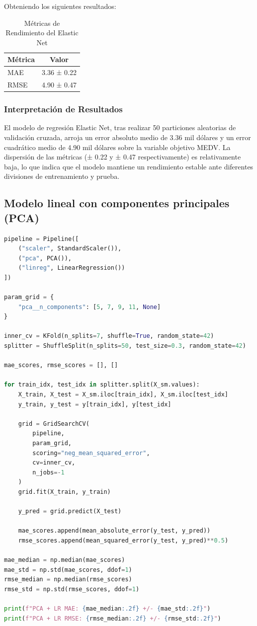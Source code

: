 \documentclass[12pt,a4paper]{article}
\begin{document}
Obteniendo los siguientes resultados:

\begin{table}[H]
\centering
\caption{Métricas de Rendimiento del Elastic Net}\label{tab:elastic_net_resultados}
\begin{tabular}{lc}
\toprule
\textbf{Métrica} & \textbf{Valor} \\
\midrule
MAE & 3.36 ± 0.22 \\
RMSE & 4.90 ± 0.47 \\
\bottomrule
\end{tabular}
\end{table}

\subsubsection{Interpretación de Resultados}
El modelo de regresión Elastic Net, tras realizar 50 particiones aleatorias de validación cruzada, arroja un error absoluto medio de 3.36 mil dólares y un error cuadrático medio de 4.90 mil dólares sobre la variable objetivo MEDV.
La dispersión de las métricas (± 0.22 y ± 0.47 respectivamente) es relativamente baja, lo que indica que el modelo mantiene un rendimiento estable ante diferentes divisiones de entrenamiento y prueba.
\vspace{1cm}

\subsection{Modelo lineal con componentes principales (PCA)}

\begin{lstlisting}[language=Python, frame=single, basicstyle=\ttfamily\small, breaklines=true]
pipeline = Pipeline([
    ("scaler", StandardScaler()),
    ("pca", PCA()),
    ("linreg", LinearRegression())
])

param_grid = {
    "pca__n_components": [5, 7, 9, 11, None]
}

inner_cv = KFold(n_splits=7, shuffle=True, random_state=42)
splitter = ShuffleSplit(n_splits=50, test_size=0.3, random_state=42)

mae_scores, rmse_scores = [], []

for train_idx, test_idx in splitter.split(X_sm.values):
    X_train, X_test = X_sm.iloc[train_idx], X_sm.iloc[test_idx]
    y_train, y_test = y[train_idx], y[test_idx]

    grid = GridSearchCV(
        pipeline,
        param_grid,
        scoring="neg_mean_squared_error",
        cv=inner_cv,
        n_jobs=-1
    )
    grid.fit(X_train, y_train)

    y_pred = grid.predict(X_test)

    mae_scores.append(mean_absolute_error(y_test, y_pred))
    rmse_scores.append(mean_squared_error(y_test, y_pred)**0.5)

mae_median = np.median(mae_scores)
mae_std = np.std(mae_scores, ddof=1)
rmse_median = np.median(rmse_scores)
rmse_std = np.std(rmse_scores, ddof=1)

print(f"PCA + LR MAE: {mae_median:.2f} +/- {mae_std:.2f}")
print(f"PCA + LR RMSE: {rmse_median:.2f} +/- {rmse_std:.2f}")
\end{lstlisting}
\end{document}
